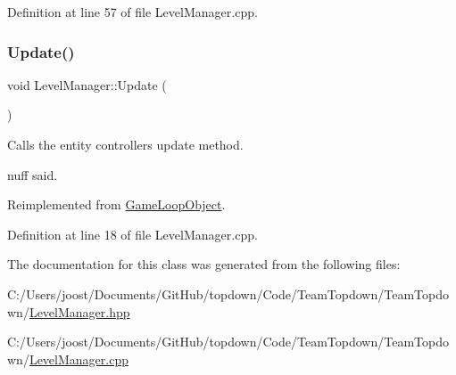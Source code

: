Definition at line 57 of file Level\+Manager.\+cpp.

\mbox{\label{class_level_manager_a7800611361e7c2ae99102e69429456fc}} 
\subsubsection{\texorpdfstring{Update()}{Update()}}
{\footnotesize\ttfamily void Level\+Manager\+::\+Update (\begin{DoxyParamCaption}{ }\end{DoxyParamCaption})\hspace{0.3cm}{\ttfamily [virtual]}}



Calls the entity controller\textquotesingle{}s update method. 

\textquotesingle{}nuff said. 

Reimplemented from \hyperlink{class_game_loop_object_ae36a15981f1dd3f3bea6050473490349}{Game\+Loop\+Object}.



Definition at line 18 of file Level\+Manager.\+cpp.



The documentation for this class was generated from the following files\+:\begin{DoxyCompactItemize}
\item 
C\+:/\+Users/joost/\+Documents/\+Git\+Hub/topdown/\+Code/\+Team\+Topdown/\+Team\+Topdown/\hyperlink{_level_manager_8hpp}{Level\+Manager.\+hpp}\item 
C\+:/\+Users/joost/\+Documents/\+Git\+Hub/topdown/\+Code/\+Team\+Topdown/\+Team\+Topdown/\hyperlink{_level_manager_8cpp}{Level\+Manager.\+cpp}\end{DoxyCompactItemize}
